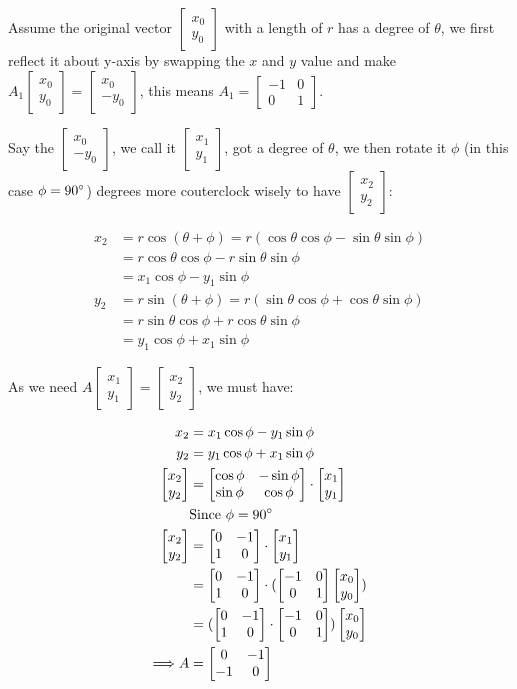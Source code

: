 \documentclass[11pt]{article}
\providecommand{\qbm}[1]{\begin{bmatrix} #1 \end{bmatrix}}
\begin{document}
Assume the original vector $\qbm{x_0 \\ y_0}$ with a length of $r$ has a degree of $\theta$, we first reflect it about y-axis by swapping the $x$ and $y$ value and make $A_1 \qbm{x_0 \\ y_0} = \qbm{x_0 \\ -y_0}$, this means $A_1 = \qbm{-1 & 0 \\ 0 & 1}$.


Say the $\qbm{x_0 \\ -y_0}$, we call it $\qbm{x_1 \\ y_1}$, got a degree of $\theta$, we then rotate it $\phi$ (in this case $\phi = 90\degree$) degrees more couterclock wisely to have $\qbm{x_2 \\ y_2}$:

\begin{align*}
    x_2 &= r \cos(\theta + \phi) = r(\cos \theta \cos \phi - \sin \theta \sin \phi) \\
    &= r \cos \theta \cos \phi - r \sin \theta \sin \phi \\
    &= x_1 \cos \phi - y_1 \sin \phi \\
    y_2 &= r \sin(\theta + \phi) = r(\sin \theta \cos \phi + \cos \theta \sin \phi) \\
    &= r\sin \theta \cos \phi + r\cos \theta \sin \phi \\
    &= y_1 \cos \phi + x_1 \sin \phi
\end{align*}

As we need $A \qbm{x_1 \\ y_1} = \qbm{x_2 \\ y_2}$, we must have:

\begin{align*}
    x_2 &= x_1 \cos \phi - y_1 \sin \phi \\
    y_2 &= y_1 \cos \phi + x_1 \sin \phi \\
    \qbm{x_2 \\ y_2} &= \qbm{\cos \phi & -\sin \phi \\ \sin \phi & \cos \phi} \cdot \qbm{x_1 \\ y_1} \\
    &\text{Since}\ \phi = 90\degree \\
    \qbm{x_2 \\ y_2} &= \qbm{0 & -1 \\ 1 & 0} \cdot \qbm{x_1 \\ y_1} \\
    &= \qbm{0 & -1 \\ 1 & 0} \cdot (\qbm{-1 & 0 \\ 0 & 1} \qbm{x_0 \\ y_0}) \\
    &= (\qbm{0 & -1 \\ 1 & 0} \cdot \qbm{-1 & 0 \\ 0 & 1}) \qbm{x_0 \\ y_0} \\
    \Longrightarrow A &= \qbm{0 & -1 \\ -1 & 0}
\end{align*}
\end{document}
